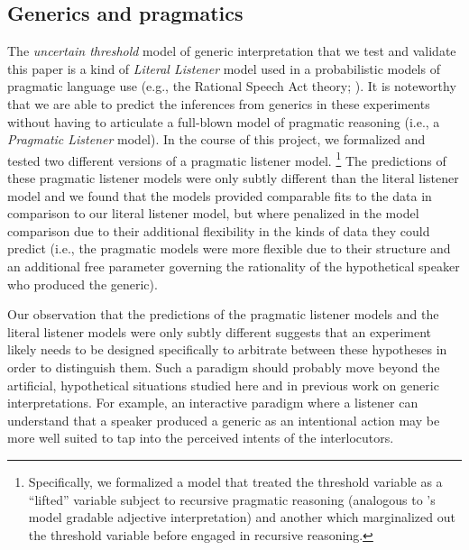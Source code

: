 \documentclass[floatsintext,doc]{apa6}
\let\rmarkdownfootnote\footnote%
\def\footnote{\protect\rmarkdownfootnote}
\begin{document}
\subsection{Generics and pragmatics}

The \emph{uncertain threshold} model of generic interpretation that we test and validate this paper is a kind of \emph{Literal Listener} model used in a probabilistic models of pragmatic language use (e.g., the Rational Speech Act theory; ). 
It is noteworthy that we are able to predict the inferences from generics in these experiments without having to articulate a full-blown model of pragmatic reasoning (i.e., a \emph{Pragmatic Listener} model). 
In the course of this project, we formalized and tested two different versions of a pragmatic listener model. \footnote{Specifically, we formalized a model that treated the threshold variable as a ``lifted'' variable subject to recursive pragmatic reasoning (analogous to 's model gradable adjective interpretation) and another which marginalized out the threshold variable before engaged in recursive reasoning.}
The predictions of these pragmatic listener models were only subtly different than the literal listener model and we found that the models provided comparable fits to the data in comparison to our literal listener model, but where penalized in the model comparison due to their additional flexibility in the kinds of data they could predict (i.e., the pragmatic models were more flexible due to their structure and an additional free parameter governing the rationality of the hypothetical speaker who produced the generic). 

Our observation that the predictions of the pragmatic listener models and the literal listener models were only subtly different suggests that an experiment likely needs to be designed specifically to arbitrate between these hypotheses in order to distinguish them.
Such a paradigm should probably move beyond the artificial, hypothetical situations studied here and in previous work on generic interpretations. 
For example, an interactive paradigm where a listener can understand that a speaker produced a generic as an intentional action may be more well suited to tap into the perceived intents of the interlocutors. 



\end{document}
